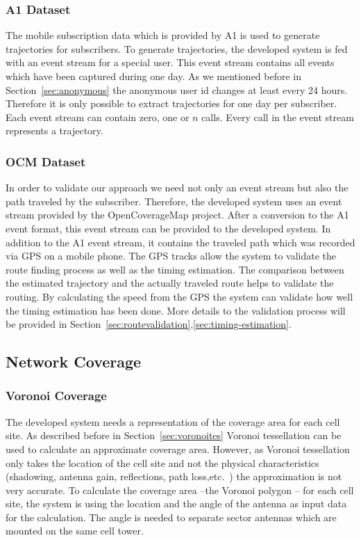 \subsubsection{A1 Dataset}
The mobile subscription data which is provided by A1 is used to generate trajectories for subscribers. To generate trajectories, the developed system is fed with an event stream for a special user. This event stream contains all events which have been captured during one day. As we mentioned before in Section~\ref{sec:anonymous} the anonymous user id changes at least every 24 hours. Therefore it is only possible to extract trajectories for one day per subscriber. Each event stream can contain zero, one or $n$ calls. Every call in the event stream represents a trajectory.
\subsubsection{OCM Dataset}
In order to validate our approach we need not only an event stream but also the path traveled by the subscriber. Therefore, the developed system uses an event stream provided by the OpenCoverageMap project. After a conversion to the A1 event format, this event stream can be provided to the developed system. In addition to the A1 event stream, it contains the traveled path which was recorded via GPS on a mobile phone. The GPS tracks allow the system to validate the route finding process as well as the timing estimation. The comparison between the estimated trajectory and the actually traveled route helps to validate the routing. By calculating the speed from the GPS the system can validate how well the timing estimation has been done. More details to the validation process will be provided in Section~\ref{sec:routevalidation},\ref{sec:timing-estimation}.

\subsection{Network Coverage}
\subsubsection{Voronoi Coverage}
The developed system needs a representation of the coverage area for each cell site. As described before in Section~\ref{sec:voronoites} Voronoi tessellation can be used to calculate an approximate coverage area. However, as Voronoi tessellation only takes the location of the cell site and not the physical characteristics (shadowing, antenna gain, reflections, path loss,etc.\ ) the approximation is not very accurate. To calculate the coverage area --the Voronoi polygon -- for each cell site, the system is using the location and the angle of the antenna as input data for the calculation. The angle is needed to separate sector antennas which are mounted on the same cell tower.
